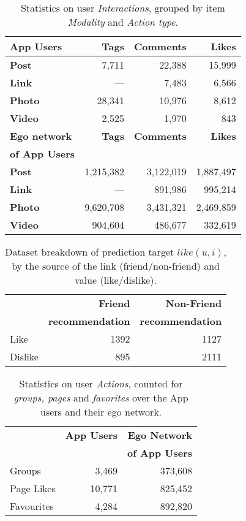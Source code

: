 \begin{table}
\centering
\begin{tabular}{|>{\small}l|>{\small}r|>{\small}r|>{\small}r|}
\hline
\textbf{App Users} & \textbf{Tags} & \textbf{Comments} & \textbf{Likes} \\
\hline
\textbf{Post} & 7,711 & 22,388 & 15,999 \\
\hline
\textbf{Link}  & --- & 7,483 & 6,566 \\
\hline
\textbf{Photo} & 28,341 & 10,976 & 8,612 \\
\hline
\textbf{Video} & 2,525 & 1,970 & 843 \\
\hline
\hline
\textbf{Ego network} & \textbf{Tags} & \textbf{Comments} & \textbf{Likes} \\
\textbf{of App Users}  & & & \\
\hline
\textbf{Post} & 1,215,382 & 3,122,019 & 1,887,497 \\
\hline
\textbf{Link} & --- & 891,986 & 995,214 \\
\hline
\textbf{Photo} & 9,620,708 & 3,431,321 & 2,469,859 \\
\hline
\textbf{Video} & 904,604 & 486,677 & 332,619 \\
\hline
\end{tabular}
\caption{Statistics on user {\em Interactions}, grouped by item {\em Modality} and {\em Action type}.}
\label{tab:interactions}
\end{table}

\begin{table}[t!]
\centering
\begin{tabular}{|>{\small}l|>{\small}r|>{\small}r|}\hline
&\textbf{Friend}  & \textbf{Non-Friend} \\
&\textbf{recommendation}  & \textbf{recommendation} \\
\hline
Like& 1392 & 1127 \\
\hline
Dislike& 895 & 2111\\
\hline
\end{tabular}
\caption{Dataset breakdown of prediction target $like(u,i)$, by the source of the link (friend/non-friend) and value (like/dislike).}
\label{tab:likeinfo}
\end{table}

\begin{table}[t!]
\centering
\begin{tabular}{|>{\small}l|>{\small}r|>{\small}r|}
\hline
& \textbf{App Users} & \textbf{Ego Network} \\
& & \textbf{of App Users} \\
\hline
Groups & 3,469 & 373,608 \\
\hline
Page Likes & 10,771 & 825,452 \\
\hline
Favourites & 4,284 & 892,820\\
\hline
\end{tabular}
\caption{Statistics on user {\em Actions}, counted for {\em groups, pages} and {\em favorites} over the App users and their ego network.}
\label{tab:interests}
\end{table}





